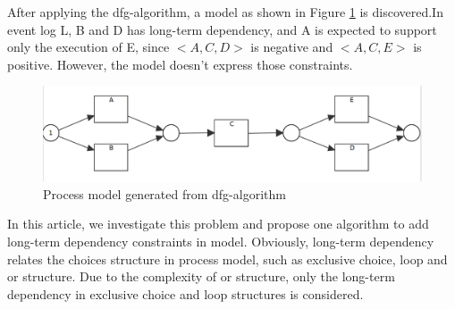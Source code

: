 \documentclass[]{article}
\begin{document}
After applying the dfg-algorithm, a model as shown in Figure \ref{fig:pn_without_lt_exm01} is discovered.In event log L, B and D has long-term dependency, and A is expected to support only the execution of E, since $<A,C,D>$ is negative and $<A,C,E>$ is positive. However, the model doesn't express those constraints.
\begin{figure}[h!]
	\includegraphics[width=\textwidth]{PN06_Seq_2_xor_notnested.png}
	\caption{Process model generated from dfg-algorithm}
	\label{fig:pn_without_lt_exm01}
\end{figure}
In this article, we investigate this problem and propose one algorithm to add long-term dependency constraints in model. Obviously, long-term dependency relates the choices structure in process model, such as exclusive choice, loop and or structure. Due to the complexity of or structure, only the long-term dependency in exclusive choice and loop structures is considered. 
\end{document}
